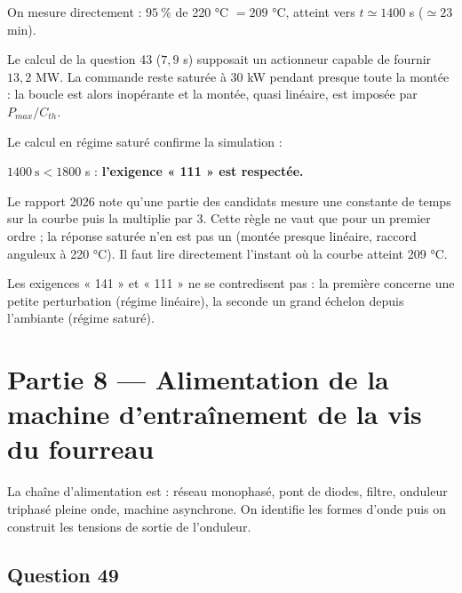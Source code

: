 \documentclass[11pt,a4paper]{article}
\newcommand{\equationajustee}[1]{%
  \sbox{\boiteequation}{$\displaystyle #1$}%
  \ifdim\wd\boiteequation>\linewidth
    \[\resizebox{\linewidth}{!}{\usebox{\boiteequation}}\]%
  \else
    \[#1\]%
  \fi}
\begin{document}
On mesure directement : \(95\ \%\) de 220 °C \(=209\) °C, atteint vers \(t\simeq1400\) s (\(\simeq23\) min).

Le calcul de la question 43 (\(7{,}9\) s) supposait un actionneur capable de fournir \(13{,}2\) MW. La commande reste saturée à 30 kW pendant presque toute la montée : la boucle est alors inopérante et la montée, quasi linéaire, est imposée par \(P_{max}/C_{th}\).

Le calcul en régime saturé confirme la simulation :

\equationajustee{t=-\tau\ln\left(1-\frac{209}{526{,}8}\right)\simeq1402\ \text{s}}

\(1400\ \text{s}<1800\) s : \textbf{l'exigence « 111 » est respectée.}

\begin{piege}

Le rapport 2026 note qu'une partie des candidats mesure une constante de temps sur la courbe puis la multiplie par 3. Cette règle ne vaut que pour un premier ordre ; la réponse saturée n'en est pas un (montée presque linéaire, raccord anguleux à 220 °C). Il faut lire directement l'instant où la courbe atteint 209 °C.

\end{piege}

\begin{methode}

Les exigences « 141 » et « 111 » ne se contredisent pas : la première concerne une petite perturbation (régime linéaire), la seconde un grand échelon depuis l'ambiante (régime saturé).

\end{methode}

\hypertarget{partie-8-alimentation-de-la-machine-dentrauxeenement-de-la-vis-du-fourreau}{%
\section{Partie 8 --- Alimentation de la machine d'entraînement de la vis du fourreau}\label{partie-8-alimentation-de-la-machine-dentrauxeenement-de-la-vis-du-fourreau}}

La chaîne d'alimentation est : réseau monophasé, pont de diodes, filtre, onduleur triphasé pleine onde, machine asynchrone. On identifie les formes d'onde puis on construit les tensions de sortie de l'onduleur.

\hypertarget{question-49}{%
\subsection{Question 49}\label{question-49}}
\end{document}
